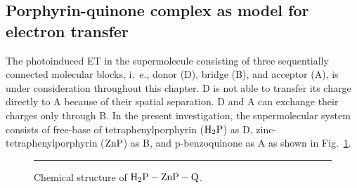 \documentclass[12pt,twoside,a4paper]{report}
\begin{document}
\subsection{Porphyrin-quinone complex as model for electron transfer\label{exper-sys}} 
The photoinduced ET in the supermolecule consisting of
three sequentially connected molecular blocks, i.~e.,  donor (D), bridge (B), and
acceptor (A), is under  consideration throughout this chapter.
D is not able to transfer its charge directly to A because of their spatial
separation. D and A can exchange their charges only through B. 
In the present investigation, 
the supermolecular system consists of
free-base of tetraphenylporphyrin (${\rm H_2P}$) as D, zinc-tetraphenylporphyrin (${\rm ZnP}$)
as B, and p-benzoquinone as A \cite{r4} 
as shown in Fig.~\ref{structH2ZnPQ}.  
\begin{footnotesize}\begin{figure}[ht] 
\centering 
\parbox{8cm}{\rule{-2cm}{0cm}\epsfxsize=10cm 
}
\caption[Chemical structure of ${\rm H_2P-ZnP-Q}$]
        {\small Chemical structure of ${\rm H_2P-ZnP-Q}$.}
 \label{structH2ZnPQ} 
\end{figure}\end{footnotesize} 


\end{document}
